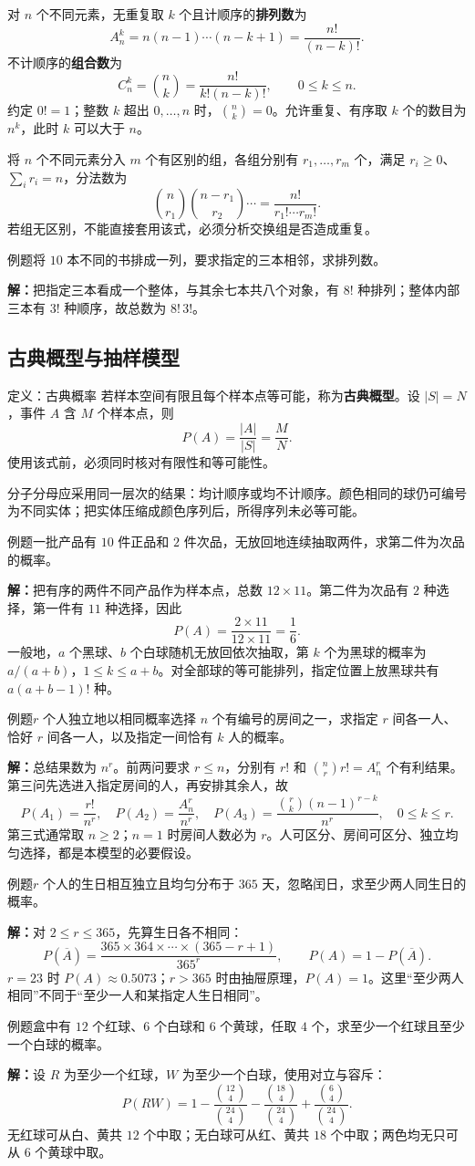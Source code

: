 \documentclass[UTF8,fontset=none,zihao=-4,a4paper]{ctexart}
\newcommand{\term}[1]{\textbf{#1}}
\newcommand{\example}[1]{\begin{infobox}{例题}#1\end{infobox}}
\newcommand{\solution}{\par\noindent\textbf{解：}}
\newcommand{\com}[2]{\binom{#1}{#2}}
\begin{document}
对 $n$ 个不同元素，无重复取 $k$ 个且计顺序的\term{排列数}为
\[
A_n^k=n(n-1)\cdots(n-k+1)=\frac{n!}{(n-k)!}.
\]
不计顺序的\term{组合数}为
\[
C_n^k=\com nk=\frac{n!}{k!(n-k)!},\qquad 0\le k\le n.
\]
约定 $0!=1$；整数 $k$ 超出 $0,\ldots,n$ 时，$\com nk=0$。允许重复、有序取 $k$ 个的数目为 $n^k$，此时 $k$ 可以大于 $n$。

将 $n$ 个不同元素分入 $m$ 个有区别的组，各组分别有 $r_1,\ldots,r_m$ 个，满足 $r_i\ge0$、$\sum_i r_i=n$，分法数为
\[
\com n{r_1}\com{n-r_1}{r_2}\cdots
=\frac{n!}{r_1!\cdots r_m!}.
\]
若组无区别，不能直接套用该式，必须分析交换组是否造成重复。
\example{将 $10$ 本不同的书排成一列，要求指定的三本相邻，求排列数。}
\solution 把指定三本看成一个整体，与其余七本共八个对象，有 $8!$ 种排列；整体内部三本有 $3!$ 种顺序，故总数为 $8!\,3!$。
\subsection{古典概型与抽样模型}
\begin{infobox}{定义：古典概率}
若样本空间有限且每个样本点等可能，称为\term{古典概型}。设 $|S|=N$，事件 $A$ 含 $M$ 个样本点，则
\[
P(A)=\frac{|A|}{|S|}=\frac MN.
\]
使用该式前，必须同时核对有限性和等可能性。
\end{infobox}
分子分母应采用同一层次的结果：均计顺序或均不计顺序。颜色相同的球仍可编号为不同实体；把实体压缩成颜色序列后，所得序列未必等可能。
\example{一批产品有 $10$ 件正品和 $2$ 件次品，无放回地连续抽取两件，求第二件为次品的概率。}
\solution 把有序的两件不同产品作为样本点，总数 $12\times11$。第二件为次品有 $2$ 种选择，第一件有 $11$ 种选择，因此
\[
P(A)=\frac{2\times11}{12\times11}=\frac16.
\]
一般地，$a$ 个黑球、$b$ 个白球随机无放回依次抽取，第 $k$ 个为黑球的概率为 $a/(a+b)$，$1\le k\le a+b$。对全部球的等可能排列，指定位置上放黑球共有 $a(a+b-1)!$ 种。
\example{$r$ 个人独立地以相同概率选择 $n$ 个有编号的房间之一，求指定 $r$ 间各一人、恰好 $r$ 间各一人，以及指定一间恰有 $k$ 人的概率。}
\solution 总结果数为 $n^r$。前两问要求 $r\le n$，分别有 $r!$ 和 $\com nr r!=A_n^r$ 个有利结果。第三问先选进入指定房间的人，再安排其余人，故
\[
P(A_1)=\frac{r!}{n^r},\quad P(A_2)=\frac{A_n^r}{n^r},\quad
P(A_3)=\frac{\com rk(n-1)^{r-k}}{n^r},\quad 0\le k\le r.
\]
第三式通常取 $n\ge2$；$n=1$ 时房间人数必为 $r$。人可区分、房间可区分、独立均匀选择，都是本模型的必要假设。
\example{$r$ 个人的生日相互独立且均匀分布于 $365$ 天，忽略闰日，求至少两人同生日的概率。}
\solution 对 $2\le r\le365$，先算生日各不相同：
\[
P(\overline A)=\frac{365\times364\times\cdots\times(365-r+1)}{365^r},
\qquad P(A)=1-P(\overline A).
\]
$r=23$ 时 $P(A)\approx0.5073$；$r>365$ 时由抽屉原理，$P(A)=1$。这里“至少两人相同”不同于“至少一人和某指定人生日相同”。
\example{盒中有 $12$ 个红球、$6$ 个白球和 $6$ 个黄球，任取 $4$ 个，求至少一个红球且至少一个白球的概率。}
\solution 设 $R$ 为至少一个红球，$W$ 为至少一个白球，使用对立与容斥：
\[
P(RW)=1-\frac{\com{12}4}{\com{24}4}
-\frac{\com{18}4}{\com{24}4}
+\frac{\com64}{\com{24}4}.
\]
无红球可从白、黄共 $12$ 个中取；无白球可从红、黄共 $18$ 个中取；两色均无只可从 $6$ 个黄球中取。
\end{document}
